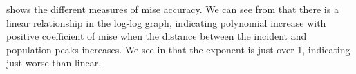 

 shows the different measures of \gls{mise} accuracy.
We can see from  that there is a linear relationship in the log-log graph,
indicating polynomial increase with positive coefficient of \gls{mise} when the distance between the incident and population peaks increases.
We see in  that the exponent is just over 1,
indicating just worse than linear.

\setpath{}
